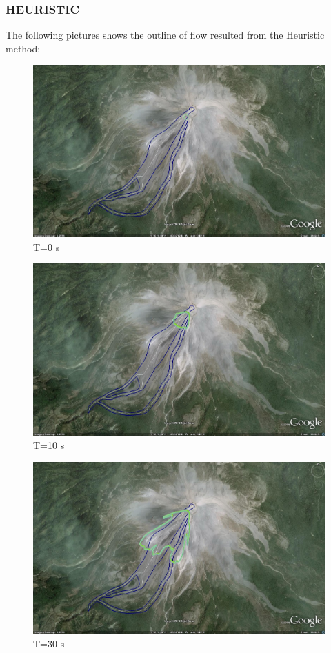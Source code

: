 \documentclass[letterpaper,10pt]{article}
\begin{document}
\newpage

\subsubsection{HEURISTIC}
The following pictures shows the outline of flow resulted from the Heuristic method:
\begin{figure}[H]
\centerline{\includegraphics[width=.9\textwidth]{IMAGES/pics/tiny0.jpg}}
\caption{T=0 s}
\label{yextent}
\end{figure}
\begin{figure}[H]
\centerline{\includegraphics[width=.9\textwidth]{IMAGES/pics/tiny1.jpg}}
\caption{T=10 s}
\label{yextent}
\end{figure}
\begin{figure}[H]
\centerline{\includegraphics[width=.9\textwidth]{IMAGES/pics/tiny3.jpg}}
\caption{T=30 s}
\label{yextent}
\end{figure}
\end{document}
